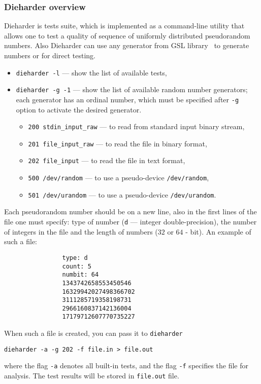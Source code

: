 \documentclass[%
floatfix,
showkeys,
nofootinbib, %
superscriptaddress, %
]{revtex4-1}
\begin{document}
\subsubsection{Dieharder overview}
Dieharder is tests suite, which is implemented as a command-line
utility that allows one to test a quality of sequence of uniformly
distributed pseudorandom numbers. Also Dieharder can use any generator
from GSL library~\cite{L_GSL:2015} to generate numbers or for direct
testing.
\begin{itemize}
        \item \verb|dieharder -l| --- show the list of available tests,
        \item \verb|dieharder -g -1| --- show the list of available random number generators; each generator has an ordinal number, which must be specified after \verb|-g| option to activate the desired generator.
        \begin{itemize}
                \item \verb|200 stdin_input_raw| --- to read from standard input binary stream,
                \item \verb|201 file_input_raw| --- to read the file in binary format,
                \item \verb|202 file_input| --- to read the file in text format,
                \item \verb|500 /dev/random| --- to use a pseudo-device \texttt{/dev/random},
                \item \verb|501 /dev/urandom| --- to use a pseudo-device \texttt{/dev/urandom}.
        \end{itemize}
\end{itemize}
Each pseudorandom number should be on a new line, also in the first lines of the file one must specify: type of number (\verb|d| --- integer double-precision), the number of integers in the file and the length of numbers ($32$ or $64$ - bit). An example of such a file:
\begin{verbatim}
                type: d
                count: 5
                numbit: 64
                1343742658553450546
                16329942027498366702
                3111285719358198731
                2966160837142136004
                17179712607770735227
\end{verbatim}
When such a file is created, you can pass it to \verb|dieharder|
\begin{verbatim}
dieharder -a -g 202 -f file.in > file.out
\end{verbatim}
where the flag \verb|-a| denotes all built-in tests, and the flag
\verb|-f| specifies the file for analysis. The test results will be
stored in \verb|file.out| file.
\end{document}
